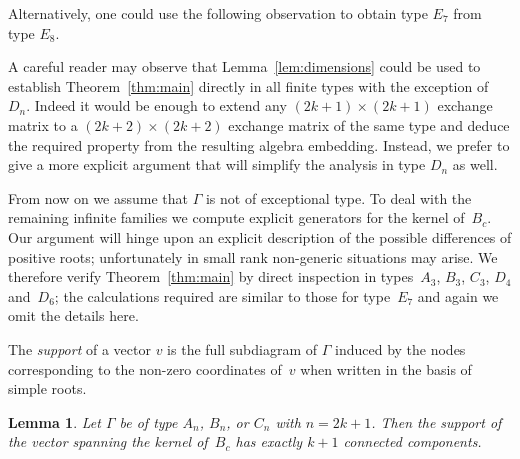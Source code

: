 \documentclass[pdftex]{sigma}
\numberwithin{equation}{section}
\newtheorem{Lemma}[Theorem]{Lemma}
\begin{document}
  Alternatively, one could use the following observation to obtain type $E_7$ from type $E_8$.

  \begin{Remark} \label{rk:induction}
    A careful reader may observe that Lemma~\ref{lem:dimensions} could be used to establish Theo\-rem~\ref{thm:main} directly in all f\/inite types with the exception of~$D_n$.
    Indeed it would be enough to extend any $(2k+1) \times (2k+1)$ exchange matrix to a $(2k+2) \times (2k+2)$ exchange matrix of the same type and deduce the required property from the resulting algebra embedding.
    Instead, we prefer to give a more explicit argument that will simplify the analysis in type $D_n$ as well.
  \end{Remark}

  From now on we assume that $\Gamma$ is not of exceptional type.
  To deal with the remaining inf\/inite families we compute explicit generators for the kernel of~$B_c$.
  Our argument will hinge upon an explicit description of the possible dif\/ferences of positive roots; unfortunately in small rank non-generic situations may arise.
  We therefore verify Theorem~\ref{thm:main} by direct inspection in types~$A_3$, $B_3$, $C_3$, $D_4$ and~$D_6$; the calculations required are similar to those for type~$E_7$ and again we omit the details here.

  \begin{Definition}
    The \emph{support} of a vector $v$ is the full subdiagram of $\Gamma$ induced by the nodes corresponding to the non-zero coordinates of~$v$ when written in the basis of simple roots.
  \end{Definition}

  \begin{Lemma}
    Let $\Gamma$ be of type $A_n$, $B_n$, or $C_n$ with $n=2k+1$.
    Then the support of the vector spanning the kernel of~$B_c$ has exactly $k+1$ connected components.
  \end{Lemma}
\end{document}
